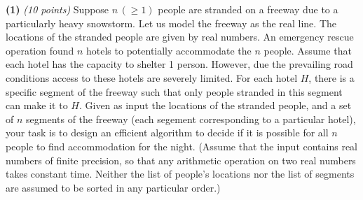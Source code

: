 \documentclass[12pt]{article}
\def\bigap{0.25in}
\begin{document}
\setlength{\parindent}{0in}
\addtolength{\parskip}{0.1cm}
\setlength{\fboxrule}{.5mm}\setlength{\fboxsep}{1.2mm}
\newlength{\boxlength}\setlength{\boxlength}{\textwidth}
\addtolength{\boxlength}{-4mm}
\begin{center}
\end{center}
\vspace{5mm}

{\bf (1)} {\em (10 points)} Suppose $n \, (\ge 1)$ people are stranded on a freeway due to a particularly heavy snowstorm. 
Let us model the freeway as the real line. The locations of the stranded people are given by real numbers. 
An emergency rescue operation found $n$ hotels to potentially accommodate the $n$ people. Assume that each hotel has the capacity to shelter 1 person.
However, due the prevailing road conditions access to these hotels are severely limited. 
For each hotel $H$, there is a specific segment of the freeway such that only people stranded in this segment can make it to $H$. 
Given as input the locations of the stranded people, and a set of $n$ segments of the freeway (each segement corresponding to a particular hotel), your task is to design an efficient algorithm to decide if it is possible for all $n$ people to find accommodation for the night. (Assume that the input contains real numbers of finite precision, so that any arithmetic operation on two real numbers takes constant time. Neither the list of people's locations nor the list of segments are assumed to be sorted in any particular order.)

\vskip \bigap

\end{document}
